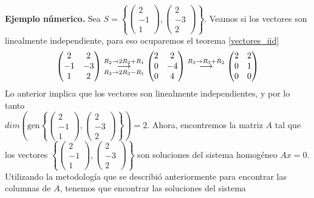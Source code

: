 \documentclass[11pt,letterpaper]{article}
\newcommand{\grstep}[2][\relax]{%
   \ensuremath{\mathrel{
       {\mathop{\longrightarrow}\limits^{#2\mathstrut}_{
                                     \begin{subarray}{l} #1 \end{subarray}}}}}}
\newcommand{\gen}{\text{gen}}
\begin{document}
\begin{enumerate}
\textbf{Ejemplo númerico.} Sea $S=\left\{\begin{pmatrix}
2\\
-1\\
1
\end{pmatrix},\begin{pmatrix}
2\\
-3\\
2
\end{pmatrix}\right\}$. Veamos si los vectores son linealmente independiente, para eso ocuparemos el teorema \ref{vectores_iid}
\begin{align*}
\begin{pmatrix}
 2 & 2\\
-1 & -3\\
1 & 2
\end{pmatrix}%
\grstep[R_3 \rightarrow 2R_3-R_1]{R_2 \rightarrow 2R_2+R_1}
%
\begin{pmatrix}
 2 & 2\\
 0 &-4\\
 0 & 4
\end{pmatrix}%
\grstep[]{R_3 \rightarrow R_3+R_2}
%
\begin{pmatrix}
 2 & 2\\
 0 & 1\\
 0 & 0
\end{pmatrix}
\end{align*}
Lo anterior implica que los vectores son linealmente independientes, y por lo tanto \\
$dim\left(\gen\left\{\begin{pmatrix}
2\\
-1\\
1
\end{pmatrix},\begin{pmatrix}
2\\
-3\\
2
\end{pmatrix}\right\}\right)=2$. Ahora, encontremos la matriz $A$ tal que los vectores $\left\{\begin{pmatrix}
2\\
-1\\
1
\end{pmatrix},\begin{pmatrix}
2\\
-3\\
2
\end{pmatrix}\right\}$ son soluciones del sistema homogéneo 
$Ax=0.$ Utilizando la metodología que se describió anteriormente para encontrar las columnas de $A$, tenemos que encontrar las soluciones del sistema

\end{enumerate}
\end{document}

